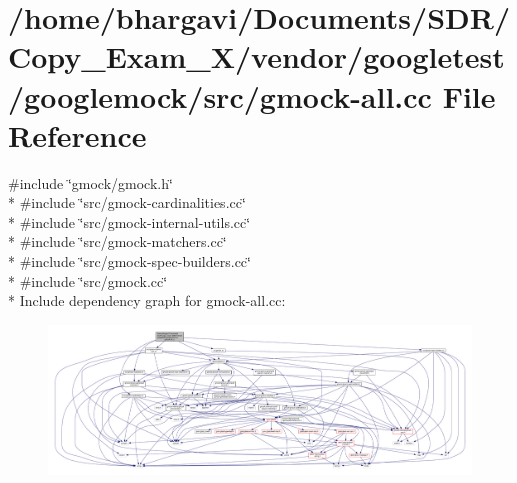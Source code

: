 \hypertarget{gmock-all_8cc}{}\section{/home/bhargavi/\+Documents/\+S\+D\+R/\+Copy\+\_\+\+Exam\+\_\+X/vendor/googletest/googlemock/src/gmock-\/all.cc File Reference}
\label{gmock-all_8cc}
{\ttfamily \#include \char`\"{}gmock/gmock.\+h\char`\"{}}\\*
{\ttfamily \#include \char`\"{}src/gmock-\/cardinalities.\+cc\char`\"{}}\\*
{\ttfamily \#include \char`\"{}src/gmock-\/internal-\/utils.\+cc\char`\"{}}\\*
{\ttfamily \#include \char`\"{}src/gmock-\/matchers.\+cc\char`\"{}}\\*
{\ttfamily \#include \char`\"{}src/gmock-\/spec-\/builders.\+cc\char`\"{}}\\*
{\ttfamily \#include \char`\"{}src/gmock.\+cc\char`\"{}}\\*
Include dependency graph for gmock-\/all.cc\+:
\nopagebreak
\begin{figure}[H]
\begin{center}
\leavevmode
\includegraphics[width=350pt]{gmock-all_8cc__incl}
\end{center}
\end{figure}
